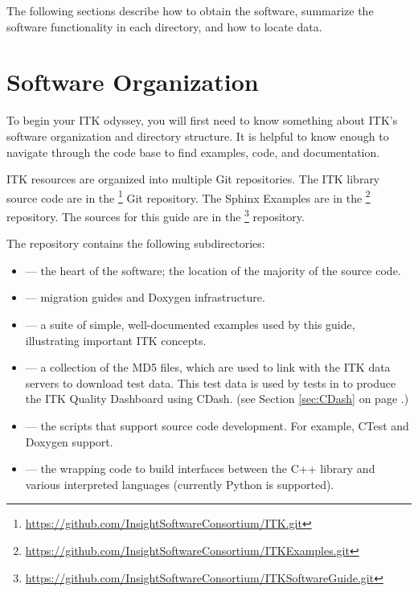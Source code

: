 The following sections describe how to obtain the software, summarize the
software functionality in each directory, and how to locate data.

\section{Software Organization}
\label{sec:SoftwareOrganization}

To begin your ITK odyssey, you will first need to know something about
ITK's software organization and directory structure. It is helpful to
know enough to navigate through the code base to find examples, code,
and documentation.

ITK resources are organized into multiple Git repositories. The ITK library source
code are in the \footnote{\url{https://github.com/InsightSoftwareConsortium/ITK.git}} Git
repository. The Sphinx Examples are in the
\footnote{\url{https://github.com/InsightSoftwareConsortium/ITKExamples.git}} repository.
The sources for this guide are in the
\footnote{\url{https://github.com/InsightSoftwareConsortium/ITKSoftwareGuide.git}}
repository.

The  repository contains the following subdirectories:
\begin{itemize}
        \item {} --- the heart of the software; the location
        of the majority of the source code.
        \item {} --- migration guides and Doxygen infrastructure.
        \item {} --- a suite of simple, well-documented
        examples used by this guide, illustrating important
        ITK concepts.
        \item {} --- a collection of the MD5 files, which are
used to link with the ITK data servers to download test data. This test data is
used by tests in  to produce the ITK Quality Dashboard using
CDash.
        (see Section \ref{sec:CDash} on page \pageref{sec:CDash}.)
        \item {} --- the scripts that support source code development. For example, CTest and Doxygen support.
        \item {} --- the wrapping code to build interfaces between the C++ library and various interpreted languages (currently Python is supported).
\end{itemize}

